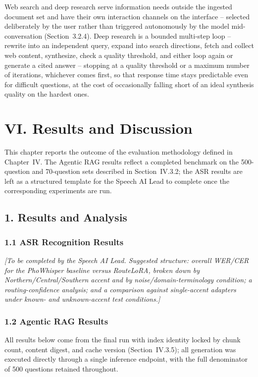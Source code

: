 \documentclass[11pt,a4paper]{article}
\newcommand{\guidance}[1]{%
  {\color{guidanceblue}\itshape [#1]\par}%
}
\newcommand{\chapterstart}[1]{\clearpage\section{#1}}
\begin{document}
Web search and deep research serve information needs outside the ingested
document set and have their own interaction channels on the interface --
selected deliberately by the user rather than triggered autonomously by the
model mid-conversation (Section~3.2.4). Deep research is a bounded
multi-step loop -- rewrite into an independent query, expand into search
directions, fetch and collect web content, synthesize, check a quality
threshold, and either loop again or generate a cited answer -- stopping at a
quality threshold or a maximum number of iterations, whichever comes first,
so that response time stays predictable even for difficult questions, at
the cost of occasionally falling short of an ideal synthesis quality on the
hardest ones.

\chapterstart{VI. Results and Discussion}

This chapter reports the outcome of the evaluation methodology defined in
Chapter~IV. The Agentic RAG results reflect a completed benchmark on the
500-question and 70-question sets described in Section~IV.3.2; the ASR
results are left as a structured template for the Speech AI Lead to
complete once the corresponding experiments are run.

\subsection{1. Results and Analysis}

\subsubsection{1.1 ASR Recognition Results}
\guidance{To be completed by the Speech AI Lead. Suggested structure:
overall WER/CER for the PhoWhisper baseline versus RouteLoRA, broken down by
Northern/Central/Southern accent and by noise/domain-terminology condition;
a routing-confidence analysis; and a comparison against single-accent
adapters under known- and unknown-accent test conditions.}

\subsubsection{1.2 Agentic RAG Results}

All results below come from the final run with index identity locked by
chunk count, content digest, and cache version (Section~IV.3.5); all
generation was executed directly through a single inference endpoint, with
the full denominator of 500 questions retained throughout.
\end{document}
